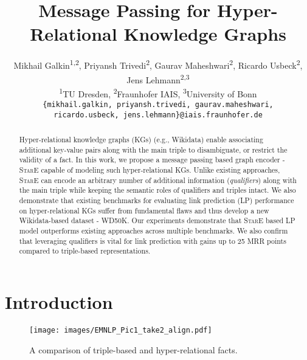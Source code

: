 \documentclass[11pt,a4paper]{article}
\title{Message Passing for Hyper-Relational Knowledge Graphs}
\author{Mikhail Galkin\textsuperscript{1,2}, Priyansh Trivedi\textsuperscript{2}, Gaurav Maheshwari\textsuperscript{2}, Ricardo Usbeck\textsuperscript{2}, Jens Lehmann\textsuperscript{2,3} \\
  \textsuperscript{1}TU Dresden, \textsuperscript{2}Fraunhofer IAIS, \textsuperscript{3}University of Bonn \\
  \texttt{\{mikhail.galkin, priyansh.trivedi, gaurav.maheshwari,} \\
  \texttt{ricardo.usbeck, jens.lehmann\}@iais.fraunhofer.de} 
  }
\date{}
\begin{document}
\maketitle
\begin{abstract}






Hyper-relational knowledge graphs (KGs) (e.g., Wikidata) enable associating additional key-value pairs along with the main triple to disambiguate, or restrict the validity of a fact. 
In this work, we propose a message passing based graph encoder - \textsc{StarE} capable of modeling such hyper-relational KGs. Unlike existing approaches, \textsc{StarE} can encode an arbitrary number of additional information (\emph{qualifiers}) along with the main triple while keeping the semantic roles of qualifiers and triples intact. We also demonstrate that existing benchmarks for evaluating link prediction (LP) performance on hyper-relational KGs suffer from fundamental flaws and thus develop a new Wikidata-based dataset - WD50K. Our experiments demonstrate that \textsc{StarE} based LP model outperforms existing approaches across multiple benchmarks. We also confirm that leveraging qualifiers is vital for link prediction with gains up to 25 MRR points compared to triple-based representations. 






\end{abstract}

\section{Introduction}

\begin{figure}[!ht]
    \centering
    \texttt{[image: images/EMNLP\_Pic1\_take2\_align.pdf]}
    \caption{A comparison of triple-based and hyper-relational facts.}
    \label{fig:example}
\end{figure}
\end{document}
